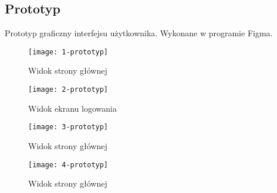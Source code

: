 \subsection{Prototyp}
Prototyp graficzny interfejsu użytkownika. Wykonane w programie Figma.
\begin{flushleft}
    \begin{figure}[!htb]
        \centering
        \texttt{[image: 1-prototyp]}
        \caption{Widok strony głównej}
    \end{figure}

    \begin{figure}[!htb]
        \centering
        \texttt{[image: 2-prototyp]}
        \caption{Widok ekranu logowania}
    \end{figure}

    \begin{figure}[!htb]
        \centering
        \texttt{[image: 3-prototyp]}
        \caption{Widok strony głównej}
    \end{figure}

    \begin{figure}[!htb]
        \centering
        \texttt{[image: 4-prototyp]}
        \caption{Widok strony głównej}
    \end{figure}   
\end{flushleft}

    


